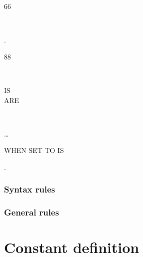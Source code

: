 \begin{syntax}
  66 \identifier {} \identifier
  \begin{0-1}
    \begin{1=}
       \\
    \end{1=}
    \identifier
  \end{0-1}.
\end{syntax}

\begin{syntax}
  88 \identifier
  \begin{1=}
     \\
  \end{1=}
  \begin{0-1}
    IS \\
    ARE
  \end{0-1}
  \begin{1=}
    \literal
    \begin{0-1}
      \begin{1=}
         \\
      \end{1=}
      \literal
    \end{0-1}
  \end{1=} \ldots

  \begin{0-1}
    WHEN SET TO  IS \literal
  \end{0-1}.
\end{syntax}

\subsubsection{Syntax rules}

\subsubsection{General rules}

\section{Constant definition}

